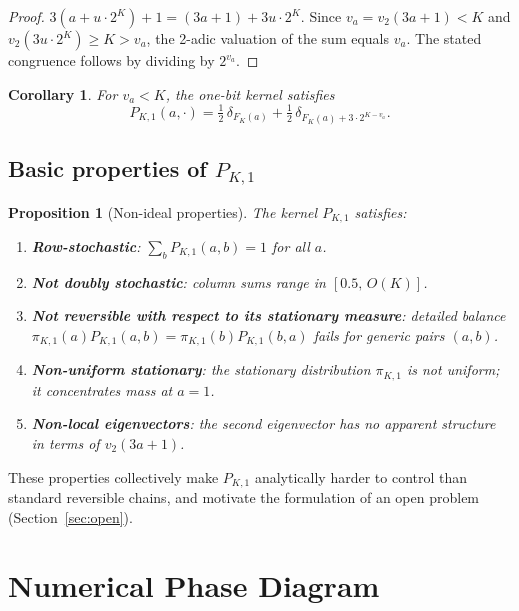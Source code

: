 \documentclass[12pt]{article}
\newtheorem{corollary}[theorem]{Corollary}
\newtheorem{proposition}[theorem]{Proposition}
\theoremstyle{definition}
\newcommand{\vt}{v_2}
\newcommand{\PKone}{P_{K,1}}
\begin{document}
\begin{proof}
$3(a+u\cdot 2^K)+1 = (3a+1)+3u\cdot 2^K$. Since $v_a = \vt(3a+1) < K$ and $\vt(3u\cdot 2^K) \geq K > v_a$, the 2-adic valuation of the sum equals $v_a$. The stated congruence follows by dividing by $2^{v_a}$.
\end{proof}

\begin{corollary}
For $v_a < K$, the one-bit kernel satisfies
\[
  \PKone(a, \cdot) = \tfrac{1}{2}\,\delta_{F_K(a)} + \tfrac{1}{2}\,\delta_{F_K(a)+3\cdot 2^{K-v_a}}.
\]
\end{corollary}

\subsection{Basic properties of $\PKone$}

\begin{proposition}[Non-ideal properties]
\label{prop:nonideal}
The kernel $\PKone$ satisfies:
\begin{enumerate}
\item \textbf{Row-stochastic}: $\sum_b \PKone(a,b) = 1$ for all $a$.
\item \textbf{Not doubly stochastic}: column sums range in $[0.5,\, O(K)]$.
\item \textbf{Not reversible with respect to its stationary measure}: detailed balance $\pi_{K,1}(a)\PKone(a,b) = \pi_{K,1}(b)\PKone(b,a)$ fails for generic pairs $(a,b)$.
\item \textbf{Non-uniform stationary}: the stationary distribution $\pi_{K,1}$ is not uniform; it concentrates mass at $a=1$.
\item \textbf{Non-local eigenvectors}: the second eigenvector has no apparent structure in terms of $\vt(3a+1)$.
\end{enumerate}
\end{proposition}

These properties collectively make $\PKone$ analytically harder to control than standard reversible chains, and motivate the formulation of an open problem (Section~\ref{sec:open}).

\section{Numerical Phase Diagram}
\label{sec:numerics}
\end{document}
